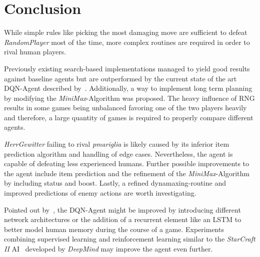 
\chapter{Conclusion}
\label{ch:conclusion}
While simple rules like picking the most damaging move are sufficient to defeat 
\textit{RandomPlayer} most of the time, more complex routines are required 
in order to rival human players. 

Previously existing search-based implementations managed to yield good results against 
baseline agents but are outperformed by the current state of the art DQN-Agent 
described by~\cite{Huang_Lee_2019}. 
Additionally, a way to implement long term planning by modifying the \textit{MiniMax}-Algorithm
was proposed. The heavy influence of \ac{RNG} results in some games being unbalanced favoring one
of the two players heavily and therefore, a large quantity of games is required to properly 
compare different agents.

\textit{HerrGewitter} failing to rival \textit{pmariglia} is likely caused by its inferior
item prediction algorithm and handling of edge cases. Nevertheless, the agent is capable
of defeating less experienced humans. Further possible improvements to the agent include
item prediction and the refinement of the \textit{MiniMax}-Algorithm by including status
and boost. Lastly, a refined dynamaxing-routine and improved
predictions of enemy actions are worth investigating.

Pointed out by~\cite{Huang_Lee_2019}, the DQN-Agent might be improved
by introducing \grqq different network architectures or the addition
of a recurrent element like an LSTM to better model human memory during the 
course of a game\grqq. Experiments combining supervised learning and
reinforcement learning similar to the \textit{StarCraft II} AI~\cite{OpenAI:AlphaStar}
developed by \textit{DeepMind} may improve the agent even further. 